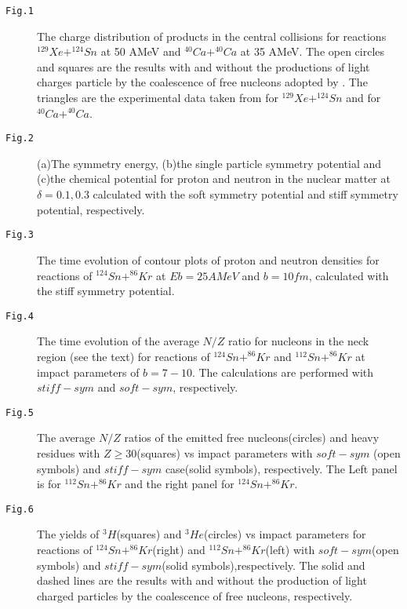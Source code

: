 \documentclass[aps,prc,groupedaddress,showpacs,manuscript]{revtex4}
\begin{document}
\newpage
\begin{description}
\item[\texttt{Fig.1}] The charge distribution of products in the
central collisions for reactions $^{129}Xe+^{124}Sn$ at 50 AMeV
and $^{40}Ca+^{40}Ca$ at 35 AMeV. The open circles and squares are
the results with and without the productions of light charges
particle by the coalescence of free nucleons adopted by
\cite{Neu00}. The triangles are the experimental data taken from
\cite{Hud03} for $^{129}Xe+^{124}Sn$ and \cite{Hag94} for
$^{40}Ca+^{40}Ca$.
 \item[\texttt{Fig.2}] (a)The symmetry energy, (b)the single
particle symmetry potential and (c)the chemical potential for
proton and neutron in the nuclear matter at $\delta=0.1,0.3$
calculated with the soft symmetry potential and stiff symmetry
potential, respectively.

\item[\texttt{Fig.3}] The time evolution of contour plots of
proton and neutron densities for reactions of $^{124}Sn+^{86}Kr$
at $Eb=25AMeV$ and $b=10fm$, calculated with the stiff symmetry
potential.

\item[\texttt{Fig.4}] The time evolution of the average $N/Z$
ratio for nucleons in the neck region (see the text) for reactions
of $^{124}Sn+^{86}Kr$ and $^{112}Sn+^{86}Kr$ at impact parameters
of $b=7-10$. The calculations are performed with $stiff-sym$  and
$soft-sym$, respectively.

\item[\texttt{Fig.5}] The average $N/Z$ ratios of the emitted free
nucleons(circles) and heavy residues with $Z\geq30$(squares) vs
impact parameters with $soft-sym$ (open symbols) and $stiff-sym$
case(solid symbols), respectively. The Left panel is for
$^{112}Sn+^{86}Kr$ and the right panel for $^{124}Sn+^{86}Kr$.

\item[\texttt{Fig.6}] The yields of $^{3}H$(squares) and
$^{3}He$(circles) vs impact parameters for reactions of
$^{124}Sn+^{86}Kr$(right) and $^{112}Sn+^{86}Kr$(left) with
$soft-sym$(open symbols) and $stiff-sym$(solid
symbols),respectively. The solid and dashed lines are the results
with and without the production of light charged particles by the
coalescence of free nucleons, respectively.

\end{description}
\end{document}
